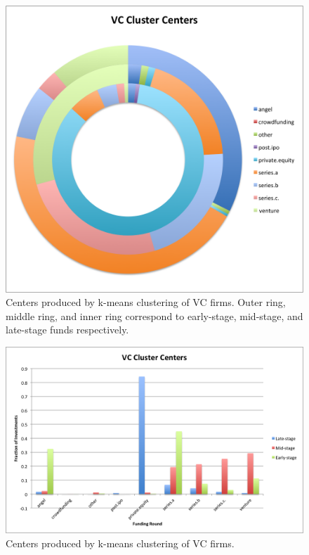 \documentclass{article}
\begin{document}
\begin{figure}[ht]
\vskip 0.2in
\begin{center}
\centerline{\includegraphics[width=\columnwidth]{cluster-centers.png}}
\caption{Centers produced by k-means clustering of VC firms. Outer ring, middle ring, and inner ring correspond to early-stage, mid-stage, and late-stage funds respectively.}
\label{VC Cluster Centers}
\end{center}
\vskip -0.2in
\end{figure}

\begin{figure}[ht]
\vskip 0.2in
\begin{center}
\centerline{\includegraphics[width=\columnwidth]{cluster-centers-2.png}}
\caption{Centers produced by k-means clustering of VC firms.}
\label{VC Cluster Centers}
\end{center}
\vskip -0.2in
\end{figure}
\end{document}
